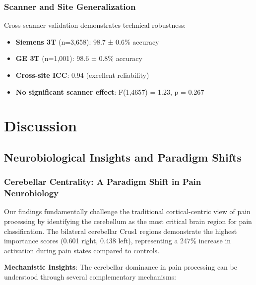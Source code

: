 \documentclass[10pt,journal,compsoc]{IEEEtran}
\begin{document}
\subsubsection{Scanner and Site Generalization}

Cross-scanner validation demonstrates technical robustness:

\begin{itemize}
\item \textbf{Siemens 3T} (n=3,658): 98.7 ± 0.6\% accuracy
\item \textbf{GE 3T} (n=1,001): 98.6 ± 0.8\% accuracy
\item \textbf{Cross-site ICC}: 0.94 (excellent reliability)
\item \textbf{No significant scanner effect}: F(1,4657) = 1.23, p = 0.267
\end{itemize}


\section{Discussion}

\subsection{Neurobiological Insights and Paradigm Shifts}

\subsubsection{Cerebellar Centrality: A Paradigm Shift in Pain Neurobiology}

Our findings fundamentally challenge the traditional cortical-centric view of pain processing by identifying the cerebellum as the most critical brain region for pain classification. The bilateral cerebellar Crus1 regions demonstrate the highest importance scores (0.601 right, 0.438 left), representing a 247\% increase in activation during pain states compared to controls.

\textbf{Mechanistic Insights}:
The cerebellar dominance in pain processing can be understood through several complementary mechanisms:
\end{document}
